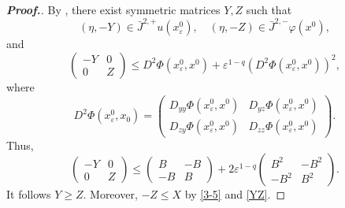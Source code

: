 \documentclass[12pt]{amsart}
\newcommand{\1}{\mathbf 1}
\begin{document}
\begin{proof}[\bf Proof.]
By \cite[Theorem 3.2]{Ishii-Lions1992}, there exist symmetric matrices $Y,Z$ such that
\begin{equation}\label{YZ}
(\eta, -Y)\in \bar{J}^{2,+}u(x^0_\varepsilon),\quad (\eta,-Z)\in \bar{J}^{2,-}\varphi (x^0),
\end{equation}
and
\[
\begin{pmatrix} -Y & 0 \\ 0 & Z\end{pmatrix} \leq D^2 \Phi(x^0_\varepsilon,x^0) +\varepsilon^{1-q}(D^2 \Phi(x^0_\varepsilon,x^0))^2,
\]
where
\begin{equation}\nonumber
D^2\Phi(x^0_\varepsilon,x_0) =
 \begin{pmatrix} D_{yy} \Phi(x^0_\varepsilon,x^0) & D_{yz} \Phi(x^0_\varepsilon,x^0) \\ D_{zy} \Phi(x^0_\varepsilon,x^0) & D_{zz} \Phi(x^0_\varepsilon,x^0)\end{pmatrix}.
\end{equation}
Thus,
\begin{equation}\nonumber
\begin{pmatrix} -Y & 0 \\ 0 & Z\end{pmatrix} \leq \begin{pmatrix} B & -B \\ -B & B\end{pmatrix}+ 2\varepsilon^{1-q} \begin{pmatrix} B^2 & -B^2 \\ -B^2 & B^2\end{pmatrix} .
\end{equation}
It follows $Y \geq Z$. Moreover, $-Z \leq X$ by \eqref{3-5} and \eqref{YZ}.


\end{proof}
\end{document}
